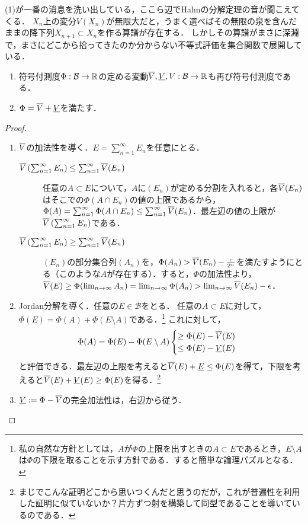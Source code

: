 \documentclass[uplatex, dvipdfmx]{jsreport}
\renewcommand{\B}{\mathcal{B}}
\begin{document}
\begin{remarks}[有界な符号付測度の全変動は有界である]
    (1)が一番の消息を洗い出している，ここら辺でHahnの分解定理の音が聞こえてくる．
    $X_n$上の変分$V(X_n)$が無限大だと，うまく選べばその無限の泉を含んだままの降下列$X_{n+1}\subset X_n$を作る算譜が存在する．
    しかしその算譜がまさに深淵で，まさにどこから拾ってきたのか分からない不等式評価を集合関数で展開している．
\end{remarks}

\begin{theorem}\mbox{}\label{thm-Jordan-decomposition}
    \begin{enumerate}
        \item 符号付測度$\Phi:\B\to\R$の定める変動$\o{V},\u{V},V:\B\to\R$も再び符号付測度である．
        \item $\Phi=\overline{V}+\underline{V}$を満たす．
    \end{enumerate}
\end{theorem}
\begin{proof}\mbox{}
    \begin{enumerate}
        \item $\overline{V}$の加法性を導く．$E=\sum^\infty_{n=1}E_n$を任意にとる．
        \begin{description}
            \item[$\overline{V}\left(\sum^\infty_{n=1}E_n\right)\le\sum^\infty_{n=1}\overline{V}(E_n)$] 任意の$A\subset E$について，$A$に$(E_n)$が定める分割を入れると，各$\overline{V}(E_n)$はそこでの$\Phi(A\cap E_n)$の値の上限であるから，$\Phi(A)=\sum^\infty_{n=1}\Phi(A\cap E_n)\le\sum^\infty_{n=1}\overline{V}(E_n)$．最左辺の値の上限が$\overline{V}\left(\sum^\infty_{n=1}E_n\right)$である．
            \item[$\overline{V}\left(\sum^\infty_{n=1}E_n\right)\ge\sum^\infty_{n=1}\overline{V}(E_n)$] $(E_n)$の部分集合列$(A_n)$を，$\Phi(A_n)>\overline{V}(E_n)-\frac{\epsilon}{2^n}$を満たすようにとる（このような$A$が存在する）．すると，$\Phi$の加法性より，$\overline{V}(E)\ge\Phi(\lim_{n\to\infty}A_n)=\lim_{n\to\infty}\Phi(A_n)>\lim_{n\to\infty}\overline{V}(E_n)-\epsilon$．
        \end{description}
        \item Jordan分解を導く．任意の$E\in\B$をとる．
        任意の$A\subset E$に対して，$\Phi(E)=\Phi(A)+\Phi(E\setminus A)$である．\footnote{私の自然な方針としては，$A$が$\Phi$の上限を出すときの$A\subset E$であるとき，$E\setminus A$は$\Phi$の下限を取ることを示す方針である．すると簡単な論理パズルとなる．}
        これに対して，
        \[\Phi(A)=\Phi(E)-\Phi(E\setminus A)\begin{cases}
            \ge\Phi(E)-\overline{V}(E)\\
            \le\Phi(E)-\underline{V}(E)
        \end{cases}\]
        と評価できる．最左辺の上限を考えると$\overline{V}(E)+\underline{E}\le\Phi(E)$を得て，下限を考えると$\overline{V}(E)+\underline{V}(E)\ge\Phi(E)$を得る．\footnote{まじでこんな証明どこから思いつくんだと思うのだが，これが普遍性を利用した証明に似ていないか？片方ずつ射を構築して同型であることを導いているのである．}
        \item $\underline{V}:=\Phi-\overline{V}$の完全加法性は，右辺から従う．
    \end{enumerate}
\end{proof}
\end{document}
